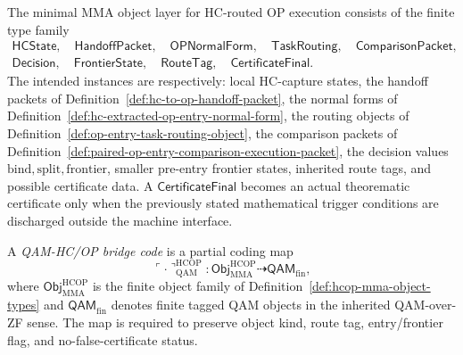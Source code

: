 \begin{definition}
\label{def:hcop-mma-object-types}
The minimal MMA object layer for HC-routed OP execution consists of the finite type family
\[
\begin{aligned}
 \mathsf{HCState},\quad
 \mathsf{HandoffPacket},\quad
 \mathsf{OPNormalForm},\quad
 \mathsf{TaskRouting},\quad
 \mathsf{ComparisonPacket},\\
 \mathsf{Decision},\quad
 \mathsf{FrontierState},\quad
 \mathsf{RouteTag},\quad
 \mathsf{CertificateFinal}.
\end{aligned}
\]
The intended instances are respectively: local HC-capture states, the handoff packets of Definition~\ref{def:hc-to-op-handoff-packet}, the normal forms of Definition~\ref{def:hc-extracted-op-entry-normal-form}, the routing objects of Definition~\ref{def:op-entry-task-routing-object}, the comparison packets of Definition~\ref{def:paired-op-entry-comparison-execution-packet}, the decision values \(\mathrm{bind},\mathrm{split},\mathrm{frontier}\), smaller pre-entry frontier states, inherited route tags, and possible certificate data. A \(\mathsf{CertificateFinal}\) becomes an actual theorematic certificate only when the previously stated mathematical trigger conditions are discharged outside the machine interface.
\end{definition}

\begin{definition}
\label{def:qam-coding-bridge-for-hcop-objects}
A \emph{QAM-HC/OP bridge code} is a partial coding map
\[
 \ulcorner\cdot\urcorner_{\mathrm{QAM}}^{\mathrm{HCOP}}
 :
 \mathsf{Obj}_{\mathrm{MMA}}^{\mathrm{HCOP}}
 \dashrightarrow
 \mathsf{QAM}_{\mathrm{fin}},
\]
where \(\mathsf{Obj}_{\mathrm{MMA}}^{\mathrm{HCOP}}\) is the finite object family of Definition~\ref{def:hcop-mma-object-types} and \(\mathsf{QAM}_{\mathrm{fin}}\) denotes finite tagged QAM objects in the inherited QAM-over-ZF sense. The map is required to preserve object kind, route tag, entry/frontier flag, and no-false-certificate status.
\end{definition}

